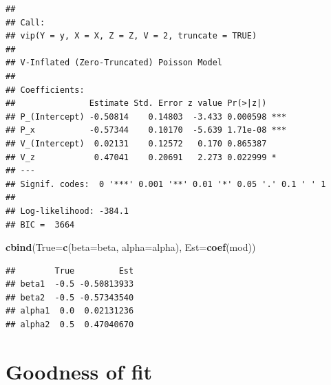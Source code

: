 \documentclass[]{article}
\newenvironment{Shaded}{\begin{snugshade}}{\end{snugshade}}
\newcommand{\KeywordTok}[1]{\textcolor[rgb]{0.13,0.29,0.53}{\textbf{#1}}}
\newcommand{\DataTypeTok}[1]{\textcolor[rgb]{0.13,0.29,0.53}{#1}}
\newcommand{\NormalTok}[1]{#1}
\begin{document}
\begin{verbatim}
## 
## Call:
## vip(Y = y, X = X, Z = Z, V = 2, truncate = TRUE)
## 
## V-Inflated (Zero-Truncated) Poisson Model
## 
## Coefficients:
##               Estimate Std. Error z value Pr(>|z|)    
## P_(Intercept) -0.50814    0.14803  -3.433 0.000598 ***
## P_x           -0.57344    0.10170  -5.639 1.71e-08 ***
## V_(Intercept)  0.02131    0.12572   0.170 0.865387    
## V_z            0.47041    0.20691   2.273 0.022999 *  
## ---
## Signif. codes:  0 '***' 0.001 '**' 0.01 '*' 0.05 '.' 0.1 ' ' 1 
## 
## Log-likelihood: -384.1 
## BIC =  3664
\end{verbatim}

\begin{Shaded}
\begin{Highlighting}[]
\KeywordTok{cbind}\NormalTok{(}\DataTypeTok{True=}\KeywordTok{c}\NormalTok{(}\DataTypeTok{beta=}\NormalTok{beta, }\DataTypeTok{alpha=}\NormalTok{alpha),}
      \DataTypeTok{Est=}\KeywordTok{coef}\NormalTok{(mod))}
\end{Highlighting}
\end{Shaded}

\begin{verbatim}
##        True         Est
## beta1  -0.5 -0.50813933
## beta2  -0.5 -0.57343540
## alpha1  0.0  0.02131236
## alpha2  0.5  0.47040670
\end{verbatim}

\section{Goodness of fit}\label{goodness-of-fit-2}
\end{document}
